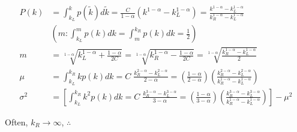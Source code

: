 \documentclass[10pt,letterpaper]{article}
\begin{document}
\begin{align}\label{eq:md}
	P(k) &=\int_{k_L}^k p(\tilde{k})d\tilde{k}=\frac{C}{1-\alpha}(k^{1-\alpha}-k_L^{1-\alpha})=
	\frac{k^{1-\alpha}-k_L^{1-\alpha}}{k_R^{1-\alpha}-k_L^{1-\alpha}}\nonumber\\
	&\left ( m : \int_{k_L}^{m}p(k)dk=\int_{m}^{k_R}p(k)dk=\frac{1}{2} \right )\nonumber\\
	m&=\sqrt[1-\alpha]{k_L^{1-\alpha}+\frac{1-\alpha}{2C}}=
	\sqrt[1-\alpha]{k_R^{1-\alpha}-\frac{1-\alpha}{2C}}=
	\sqrt[1-\alpha]{\frac{k_R^{1-\alpha}-k_L^{1-\alpha}}{2}}\\
	\mu &= \int_{k_L}^{k_R}kp(k)dk=C\;\frac{k_R^{2-\alpha}-k_L^{2-\alpha}}{2-\alpha}=\left(\frac{1-\alpha}{2-\alpha}\right)\left(\frac{k_R^{2-\alpha}-k_L^{2-\alpha}}{k_R^{1-\alpha}-k_L^{1-\alpha}}\right)\nonumber\\
	\sigma^2 &= \left[ \int_{k_L}^{k_R}k^2p(k)dk=C\;\frac{k_R^{3-\alpha}-k_L^{3-\alpha}}{3-\alpha} =\left(\frac{1-\alpha}{3-\alpha}\right)\left(\frac{k_R^{3-\alpha}-k_L^{3-\alpha}}{k_R^{1-\alpha}-k_L^{1-\alpha}}\right) \right] -\mu^2\nonumber
\end{align}

Often, $k_R\rightarrow \infty$, $\therefore$
\end{document}
